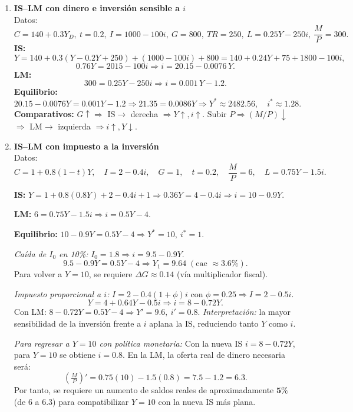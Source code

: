 \documentclass[11pt,addpoints]{article}
\begin{document}
\begin{enumerate}
\item \textbf{IS--LM con dinero e inversión sensible a \(i\)}\\
Datos:
\[
C=140+0.3Y_D,\ t=0.2,\ I=1000-100i,\ G=800,\ TR=250,\ L=0.25Y-250i,\ \frac{M}{P}=300.
\]
\textbf{IS:}
\[
Y = 140 + 0.3(Y-0.2Y+250) + (1000-100i) + 800
= 140 + 0.24Y + 75 + 1800 - 100i,
\]
\[
0.76Y = 2015 - 100i \Rightarrow i = 20.15 - 0.0076\,Y.
\]
\textbf{LM:}
\[
300 = 0.25Y - 250i \Rightarrow i = 0.001\,Y - 1.2.
\]
\textbf{Equilibrio:}
\[
20.15 - 0.0076Y = 0.001Y - 1.2 \Rightarrow 21.35 = 0.0086Y
\Rightarrow Y^* \approx 2482.56,\quad i^* \approx 1.28.
\]
\textbf{Comparativos:} \(G\uparrow \Rightarrow\) IS\(\to\) derecha \(\Rightarrow Y\uparrow,i\uparrow\). Subir \(P\Rightarrow (M/P)\downarrow\) \(\Rightarrow\) LM\(\to\) izquierda \(\Rightarrow i\uparrow, Y\downarrow\).

\item \textbf{IS--LM con impuesto a la inversión}\\
Datos:
\[
C = 1 + 0.8(1 - t)Y, \quad I = 2 - 0.4i, \quad G = 1, \quad t = 0.2, \quad \frac{M}{P} = 6, \quad L = 0.75Y - 1.5i.
\]

\textbf{IS:}\quad 
\(Y = 1 + 0.8(0.8Y) + 2 - 0.4i + 1 
\Rightarrow 0.36Y = 4 - 0.4i 
\Rightarrow i = 10 - 0.9Y.\)

\textbf{LM:}\quad 
\(6 = 0.75Y - 1.5i 
\Rightarrow i = 0.5Y - 4.\)

\textbf{Equilibrio:}\quad 
\(10 - 0.9Y = 0.5Y - 4 
\Rightarrow Y^* = 10,\ i^* = 1.\)

\vspace{0.2cm}
\emph{Caída de \(I_0\) en 10\%:} 
\(I_0 = 1.8 \Rightarrow i = 9.5 - 0.9Y.\)
\[
9.5 - 0.9Y = 0.5Y - 4 
\Rightarrow Y_1 = 9.64 \;(\text{cae } \approx 3.6\%).
\]
Para volver a \(Y = 10\), se requiere \(\Delta G \approx 0.14\) (vía multiplicador fiscal).

\vspace{0.2cm}
\emph{Impuesto proporcional a \(i\):} 
\(I = 2 - 0.4(1 + \phi)i\) con \(\phi = 0.25 \Rightarrow I = 2 - 0.5i.\)
\[
Y = 4 + 0.64Y - 0.5i 
\Rightarrow i = 8 - 0.72Y.
\]
\newpage
\vspace*{0.1cm}
Con LM: \(8 - 0.72Y = 0.5Y - 4 
\Rightarrow Y' = 9.6,\ i' = 0.8.\)
\emph{Interpretación:} la mayor sensibilidad de la inversión frente a \(i\) aplana la IS, reduciendo tanto \(Y\) como \(i\).

\vspace{0.2cm}
\emph{Para regresar a \(Y = 10\) con política monetaria:} 
Con la nueva IS \(i = 8 - 0.72Y\), para \(Y = 10\) se obtiene \(i = 0.8.\)  
En la LM, la oferta real de dinero necesaria será:
\[
\left(\tfrac{M}{P}\right)' = 0.75(10) - 1.5(0.8) = 7.5 - 1.2 = 6.3.
\]
Por tanto, se requiere un aumento de saldos reales de aproximadamente \(\mathbf{5\%}\) (de 6 a 6.3) para compatibilizar \(Y = 10\) con la nueva IS más plana.


\end{enumerate}
\end{document}
